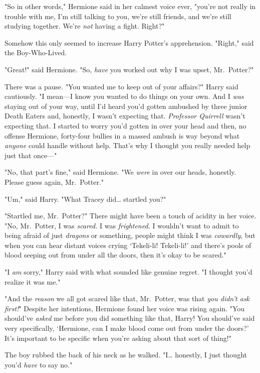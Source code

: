 "So in other words," Hermione said in her calmest voice ever, "you're not 
really in trouble with me, I'm still talking to you, we're still friends, and 
we're still studying together. We're \emph{not} having a fight. Right?"

Somehow this only seemed to increase Harry Potter's apprehension. "Right," said 
the Boy-Who-Lived.

"Great!" said Hermione. "So, \emph{have} you worked out why I was upset, 
Mr.~Potter?"

There was a pause. "You wanted me to keep out of your affairs?" Harry said 
cautiously. "I mean---I know you wanted to do things on your own. And I 
\emph{was} staying out of your way, until I'd heard you'd gotten ambushed by 
three junior Death Eaters and, honestly, I wasn't expecting that. 
\emph{Professor Quirrell} wasn't expecting that. I started to worry you'd 
gotten in over your head and then, no offense Hermione, forty-four bullies in a 
massed ambush is way beyond what \emph{anyone} could handle without help. 
That's why I thought you really needed help just that once---"

"No, that part's fine," said Hermione. "We \emph{were} in over our heads, 
honestly. Please guess again, Mr.~Potter."

"Um," said Harry. "What Tracey did{\ldots} startled you?"

"Startled me, Mr.~Potter?" There might have been a touch of acidity in her 
voice. "No, Mr.~Potter, I was \emph{scared.} I was \emph{frightened.} I 
wouldn't want to admit to being afraid of just \emph{dragons} or something, 
people might think I was \emph{cowardly}, but when you can hear distant voices 
crying `Tekeli-li! Tekeli-li!' and there's pools of blood seeping out from 
under all the doors, then it's okay to be scared."

"I \emph{am} sorry," Harry said with what sounded like genuine regret. "I 
thought you'd realize it was me."

"And the \emph{reason} we all got scared like that, Mr.~Potter, was that 
\emph{you didn't ask first!}" Despite her intentions, Hermione found her voice 
was rising again. "You should've \emph{asked} me before you did something like 
that, Harry! You should've said very specifically, `Hermione, can I make blood 
come out from under the doors?' It's important to be specific when you're 
asking about that sort of thing!"

The boy rubbed the back of his neck as he walked. "I{\ldots} honestly, I just 
thought you'd \emph{have} to say no."

